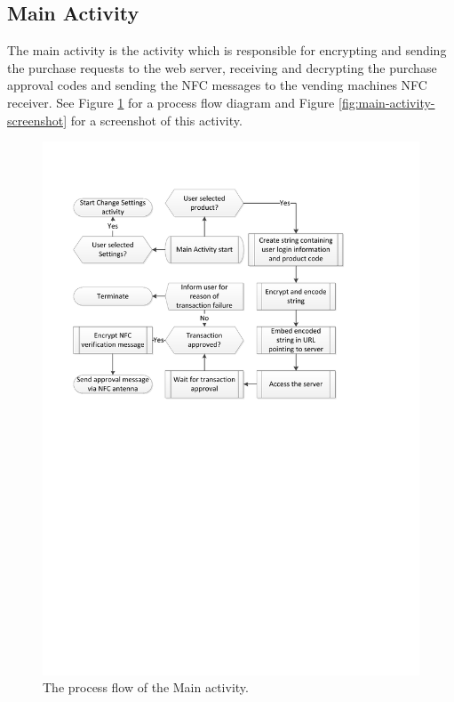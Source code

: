 \subsection{Main Activity}

The main activity is the activity which is responsible for encrypting and
sending the purchase requests to the web server, receiving and decrypting
the purchase approval codes and sending the NFC messages to the vending machines
NFC receiver. See Figure \ref{fig:main-activity} for a process flow diagram
and Figure \ref{fig:main-activity-screenshot} for a screenshot of this activity.

\begin{figure}
 \centering 
 \includegraphics[clip = true, trim = 0 420 0 76,
 scale=0.7]{app_main_processflow}
 \caption{The process flow of the Main activity.}
 \label{fig:main-activity}
\end{figure}

